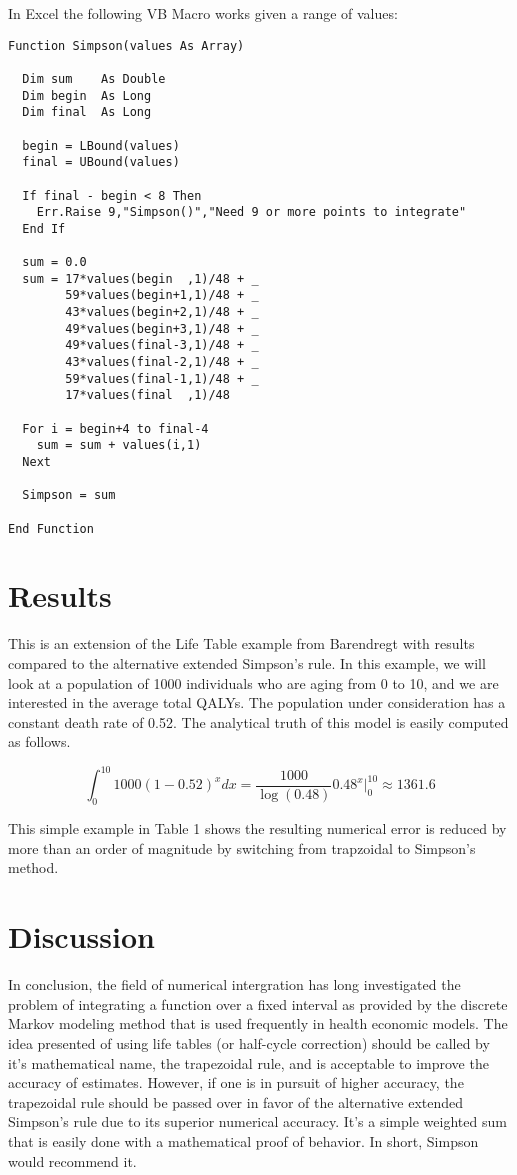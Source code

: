 \documentclass[]{article}
\begin{document}
In Excel the following VB Macro works given a range of values:

\begin{verbatim}
Function Simpson(values As Array)
  
  Dim sum    As Double
  Dim begin  As Long
  Dim final  As Long
  
  begin = LBound(values)
  final = UBound(values)
  
  If final - begin < 8 Then
    Err.Raise 9,"Simpson()","Need 9 or more points to integrate"
  End If

  sum = 0.0
  sum = 17*values(begin  ,1)/48 + _
        59*values(begin+1,1)/48 + _
        43*values(begin+2,1)/48 + _
        49*values(begin+3,1)/48 + _
        49*values(final-3,1)/48 + _
        43*values(final-2,1)/48 + _
        59*values(final-1,1)/48 + _
        17*values(final  ,1)/48
   
  For i = begin+4 to final-4
    sum = sum + values(i,1)
  Next

  Simpson = sum

End Function
\end{verbatim}

\section{Results}

This is an extension of the Life Table example from Barendregt
with results compared to the alternative extended Simpson's rule\cite{barendregt2009}.
In this example, we will look at a population of 1000
individuals who are aging from 0 to 10, and we are interested in the
average total QALYs. The population under consideration has a constant
death rate of 0.52. The analytical truth of this model is easily
computed as follows.

\[
\int^{10}_0 1000 (1-0.52)^x dx = \frac{1000}{\log(0.48)}  0.48^x \Biggr|^{10}_0 \approx  1361.6
\]

This simple example in Table 1 shows the resulting numerical error is reduced by more
than an order of magnitude by switching from trapzoidal to Simpson's
method.

\section{Discussion}

In conclusion, the field of numerical intergration has long investigated
the problem of integrating a function over a fixed interval as provided
by the discrete Markov modeling method that is used frequently in health
economic models. The idea presented of using life tables
(or half-cycle correction) should be called by it's
mathematical name, the trapezoidal rule, and is acceptable to improve
the accuracy of estimates. However, if one is in pursuit of higher
accuracy, the trapezoidal rule should be passed over in favor of the
alternative extended Simpson's rule due to its superior numerical
accuracy. It's a simple weighted sum that is easily done with a
mathematical proof of behavior. In short, Simpson would recommend it.
\end{document}
